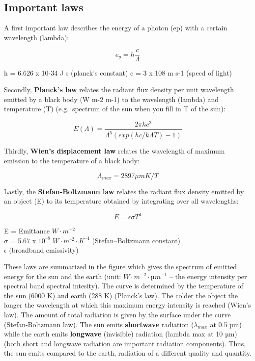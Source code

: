 \documentclass[oneside]{book}
\begin{document}
\subsection{Important laws}\label{important-laws}

A first important law describes the energy of a photon (ep) with a
certain wavelength (lambda):

\begin{equation} 
  e_p = h  \frac{c}{\Lambda}
  \label{eq:Eq1}
\end{equation}

h = 6.626 x 10-34 J s (planck's constant) c = 3 x 108 m s-1 (speed of
light)

Secondly, \textbf{Planck's law} relates the radiant flux density per
unit wavelength emitted by a black body (W m-2 m-1) to the wavelength
(lambda) and temperature (T) (e.g.~spectrum of the sun when you fill in
T of the sun):

\begin{equation} 
  E(\Lambda) =\frac{2 \pi h c^2}{\Lambda^5\left(exp(hc/k\Lambda T) - 1 \right)}
  \label{eq:Eq2}
\end{equation}

Thirdly, \textbf{Wien's displacement law} relates the wavelength of
maximum emission to the temperature of a black body:

\begin{equation} 
  \Lambda_{max} = 2897 \mu m K / T 
  \label{eq:Eq3}
\end{equation}

Lastly, the \textbf{Stefan-Boltzmann law} relates the radiant flux
density emitted by an object (E) to its temperature obtained by
integrating over all wavelengths:

\begin{equation} 
  E = \epsilon \sigma T^4
  \label{eq:Eq4}
\end{equation}

E = Emittance \(W \cdot m^{-2}\)\\
\(\sigma\) = 5.67 x \(10^{–8}\) \(W \cdot m^{–2} \cdot K^{–4}\)
(Stefan--Boltzmann constant)\\
\(\epsilon\) (broadband emissivity)

These laws are summarized in the figure which gives the spectrum of
emitted energy for the sun and the earth (unit:
\(W \cdot m^{-2} \cdot µm^{-1}\) -- the energy intensity per spectral
band spectral intesity). The curve is determined by the temperature of
the sun (6000 K) and earth (288 K) (Planck's law). The colder the object
the longer the wavelength at which this maximum energy intensity is
reached (Wien's law). The amount of total radiation is given by the
surface under the curve (Stefan-Boltzmann law). The sun emits
\textbf{shortwave} radiation (\(\lambda_{max}\) at 0.5 µm) while the
earth emits \textbf{longwave} (invisible) radiation (lambda max at 10
µm) (both short and longwave radiation are important radiation
components). Thus, the sun emits compared to the earth, radiation of a
different quality and quantity.
\end{document}
